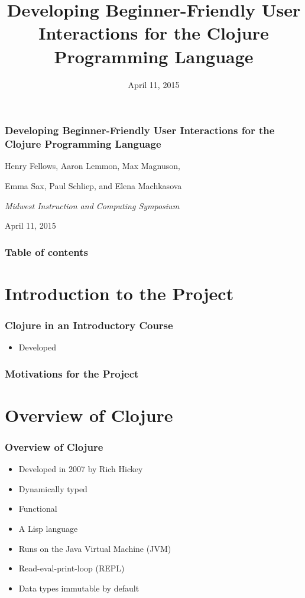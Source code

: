 \documentclass{beamer}
\begin{document}
\title{Developing Beginner-Friendly User Interactions for the Clojure Programming Language}
\date{April 11, 2015}

\begin{frame}
\frametitle{Developing Beginner-Friendly User Interactions for the Clojure Programming Language}
{\centering
\noindent
Henry Fellows, Aaron Lemmon, Max Magnuson, \par
Emma Sax, Paul Schliep, and Elena Machkasova \par

{\it 
Midwest Instruction and Computing Symposium\par
April 11, 2015\par}
}
\end{frame}

\begin{frame}
\frametitle{Table of contents}
\tableofcontents  
\end{frame}

\section{Introduction to the Project}
\begin{frame}
	\frametitle{Clojure in an Introductory Course}
	\begin{itemize}
		\item Developed 
	\end{itemize}
\end{frame}

\begin{frame}
\frametitle{Motivations for the Project}
\end{frame}

\section{Overview of Clojure}

\begin{frame}
\frametitle{Overview of Clojure}
	\begin{itemize}
  	 \item Developed in 2007 by Rich Hickey
  	 \item Dynamically typed
  	 \item Functional
  	 \item A Lisp language
  	 \item Runs on the Java Virtual Machine (JVM)
  	 \item Read-eval-print-loop (REPL)
  	 \item Data types immutable by default
	 \end{itemize}
\end{frame}
\end{document}
